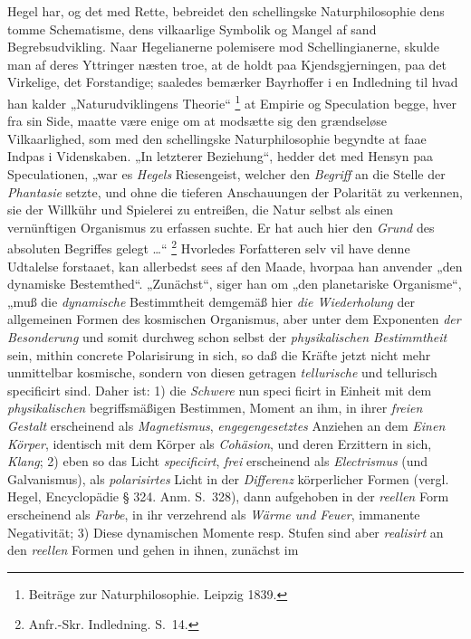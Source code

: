\documentclass[12pt]{book}
\newcommand{\apage}[1]{\marginnote{\footnotesize\textit{[#1]}}}
\begin{document}
Hegel har, og det med Rette, bebreidet den schellingske Naturphilosophie dens tomme
Schematisme, dens vilkaarlige Symbolik og Mangel af sand Begrebsudvikling. Naar
Hegelianerne polemisere mod Schellingianerne, skulde man af deres Yttringer næsten troe, at
de holdt paa Kjendsgjerningen, paa det Virkelige, det Forstandige; saaledes bemærker
Bayrhoffer i en Indledning til hvad han kalder „Naturudviklingens Theorie“%
\footnote{Beiträge zur Naturphilosophie. Leipzig 1839.}
at Empirie og Speculation begge, hver fra sin Side, maatte være enige om at modsætte sig
den grændseløse Vilkaarlighed, som med den schellingske Naturphilosophie begyndte at faae
Indpas i Videnskaben. „In letzterer Beziehung“, hedder det med Hensyn paa Speculationen,
„war es \emph{Hegels} Riesengeist, welcher den \emph{Begriff} an die Stelle der
\emph{Phantasie} setzte, und ohne die tieferen Anschauungen der Polarität zu verkennen, sie
der Willkühr und Spielerei zu entreißen, die Natur selbst als einen vernünftigen Organismus
zu erfassen suchte. Er hat auch hier den \emph{Grund} des absoluten Begriffes gelegt
\ldots“%
\footnote{Anfr.-Skr. Indledning. S.~14.}
Hvorledes Forfatteren selv vil have denne Udtalelse forstaaet, kan allerbedst sees af den
Maade, hvorpaa han anvender „den dynamiske Bestemthed“. „Zunächst“, siger han om „den
planetariske Organisme“, „muß die \emph{dynamische} Bestimmtheit demgemäß hier
\emph{die Wiederholung} der allgemeinen Formen des kosmischen Organismus, aber unter dem
Exponenten \emph{der Besonderung} und somit durchweg schon selbst der
\emph{physikalischen Bestimmtheit} sein, mithin concrete Polarisirung in sich, so daß die
Kräfte jetzt nicht mehr unmittelbar kosmische, sondern von diesen getragen
\emph{tellurische} und tellurisch specificirt sind. Daher ist: 1) die \emph{Schwere} nun
speci\-%
ficirt \apage{358} in Einheit mit dem \emph{physikalischen} begriffsmäßigen Bestimmen, Moment an ihm,
in ihrer \emph{freien Gestalt} erscheinend als \emph{Magnetismus}, \emph{engegengesetztes}
Anziehen an dem \emph{Einen Körper}, identisch mit dem Körper als \emph{Cohäsion}, und
deren Erzittern in sich, \emph{Klang}; 2) eben so das Licht \emph{specificirt}, \emph{frei}
erscheinend als \emph{Electrismus} (und Galvanismus), als \emph{polarisirtes} Licht in der
\emph{Differenz} körperlicher Formen (vergl. Hegel, Encyclopädie § 324. Anm. S.~328), dann
aufgehoben in der \emph{reellen} Form erscheinend als \emph{Farbe}, in ihr verzehrend als
\emph{Wärme und Feuer}, immanente Negativität; 3) Diese dynamischen Momente resp. Stufen
sind aber \emph{realisirt} an den \emph{reellen} Formen und gehen in ihnen, zunächst im
\end{document}
